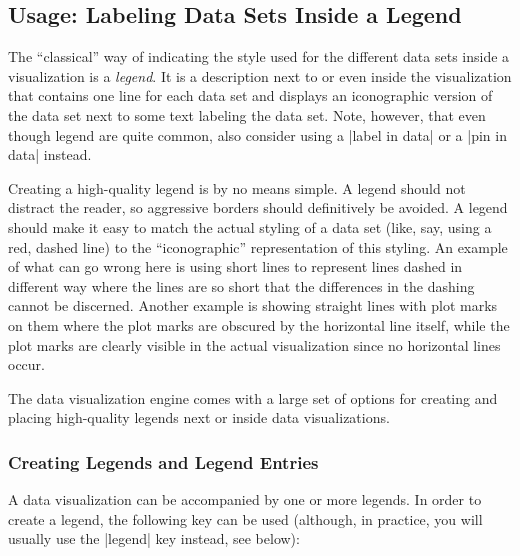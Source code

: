 \subsection{Usage: Labeling Data Sets Inside a Legend}

The ``classical'' way of indicating the style used for the different
data sets inside a visualization is a \emph{legend}. It is a
description next to or even inside the visualization that contains one
line for each data set and displays an iconographic version of the
data set next to some text labeling the data set. Note, however, that
even though legend are quite common, also
consider using a |label in data| or a |pin in data| instead.

Creating a high-quality legend is by no means simple. A legend should
not distract the reader, so aggressive borders should definitively be
avoided. A legend should make it easy to match the actual
styling of a data set (like, say, using a red, dashed line) to
the ``iconographic'' representation of this styling. An example of
what can go wrong here is using short lines to represent lines dashed
in different way where the lines are so short that the differences in
the dashing cannot be discerned. Another example is showing straight
lines with plot marks on them where the plot marks are obscured by the
horizontal line itself, while the plot marks are clearly visible in
the actual visualization since no horizontal lines occur.

The data visualization engine comes with a large set of options for
creating and placing high-quality legends next or inside data
visualizations. 

\subsubsection{Creating Legends and Legend Entries}

A data visualization can be accompanied by one or more legends. In
order to create a legend, the following key can be used (although, in
practice, you will usually use the |legend| key instead, see below):

